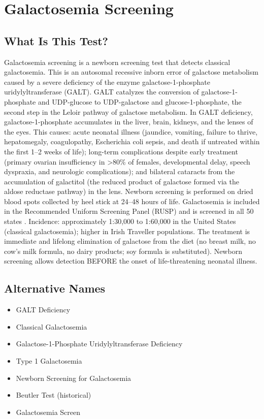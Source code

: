 \chapter{Galactosemia Screening}

\section*{What Is This Test?}
Galactosemia screening is a newborn screening test that detects classical galactosemia. This is an autosomal recessive inborn error of galactose metabolism caused by a severe deficiency of the enzyme galactose-1-phosphate uridylyltransferase (GALT). GALT catalyzes the conversion of galactose-1-phosphate and UDP-glucose to UDP-galactose and glucose-1-phosphate, the second step in the Leloir pathway of galactose metabolism. In GALT deficiency, galactose-1-phosphate accumulates in the liver, brain, kidneys, and the lenses of the eyes. This causes: acute neonatal illness (jaundice, vomiting, failure to thrive, hepatomegaly, coagulopathy, Escherichia coli sepsis, and death if untreated within the first 1--2 weeks of life); long-term complications despite early treatment (primary ovarian insufficiency in >80\% of females, developmental delay, speech dyspraxia, and neurologic complications); and bilateral cataracts from the accumulation of galactitol (the reduced product of galactose formed via the aldose reductase pathway) in the lens. Newborn screening is performed on dried blood spots collected by heel stick at 24--48 hours of life. Galactosemia is included in the Recommended Uniform Screening Panel (RUSP) and is screened in all 50 states \cite{kaye2006newborn}. Incidence: approximately 1:30,000 to 1:60,000 in the United States (classical galactosemia); higher in Irish Traveller populations. The treatment is immediate and lifelong elimination of galactose from the diet (no breast milk, no cow's milk formula, no dairy products; soy formula is substituted). Newborn screening allows detection BEFORE the onset of life-threatening neonatal illness.

\section*{Alternative Names}
\begin{itemize}
  \item GALT Deficiency
  \item Classical Galactosemia
  \item Galactose-1-Phosphate Uridylyltransferase Deficiency
  \item Type 1 Galactosemia
  \item Newborn Screening for Galactosemia
  \item Beutler Test (historical)
  \item Galactosemia Screen
\end{itemize}
